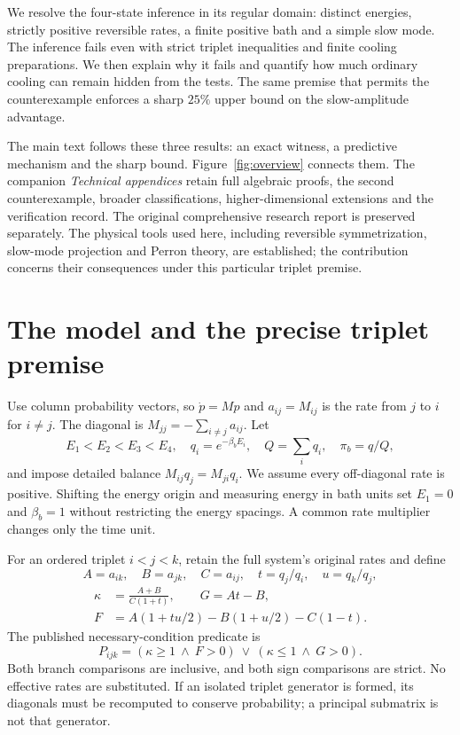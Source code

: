 \documentclass[11pt]{article}
\begin{document}
We resolve the four-state inference in its regular domain: distinct
energies, strictly positive reversible rates, a finite positive bath and
a simple slow mode. The inference fails even with strict triplet
inequalities and finite cooling preparations. We then explain why it
fails and quantify how much ordinary cooling can remain hidden from the
tests. The same premise that permits the counterexample enforces a sharp
$25\%$ upper bound on the slow-amplitude advantage.

The main text follows these three results: an exact witness, a predictive
mechanism and the sharp bound. Figure~\ref{fig:overview} connects them.
The companion \emph{Technical appendices} retain full algebraic proofs,
the second counterexample, broader classifications, higher-dimensional
extensions and the verification record. The original comprehensive
research report is preserved separately. The physical tools used here,
including reversible symmetrization, slow-mode projection and Perron
theory, are established; the contribution concerns their consequences
under this particular triplet premise.

\section{The model and the precise triplet premise}\label{sec:model}
Use column probability vectors, so $\dot p=Mp$ and $a_{ij}=M_{ij}$ is the
rate from $j$ to $i$ for $i\ne j$. The diagonal is
$M_{jj}=-\sum_{i\ne j}a_{ij}$. Let
\[
 E_1<E_2<E_3<E_4,\quad q_i=e^{-\beta_bE_i},\quad
 Q=\sum_iq_i,\quad \pi_b=q/Q,
\]
and impose detailed balance $M_{ij}q_j=M_{ji}q_i$. We assume every
off-diagonal rate is positive. Shifting the energy origin and measuring
energy in bath units set $E_1=0$ and $\beta_b=1$ without restricting the
energy spacings. A common rate multiplier changes only the time unit.

For an ordered triplet $i<j<k$, retain the full system's original rates
and define
\[
 A=a_{ik},\quad B=a_{jk},\quad C=a_{ij},\quad
 t=q_j/q_i,\quad u=q_k/q_j,
\]
\begin{align}
 \kappa&=\frac{A+B}{C(1+t)},\qquad G=At-B,\nonumber\\
 F&=A(1+tu/2)-B(1+u/2)-C(1-t).
\end{align}
The published necessary-condition predicate is
\begin{equation}\label{eq:predicate}
 P_{ijk}=(\kappa\geq1\ \land\ F>0)
       \ \lor\ (\kappa\leq1\ \land\ G>0).
\end{equation}
Both branch comparisons are inclusive, and both sign comparisons are
strict. No effective rates are substituted. If an isolated triplet
generator is formed, its diagonals must be recomputed to conserve
probability; a principal submatrix is not that generator.
\end{document}
